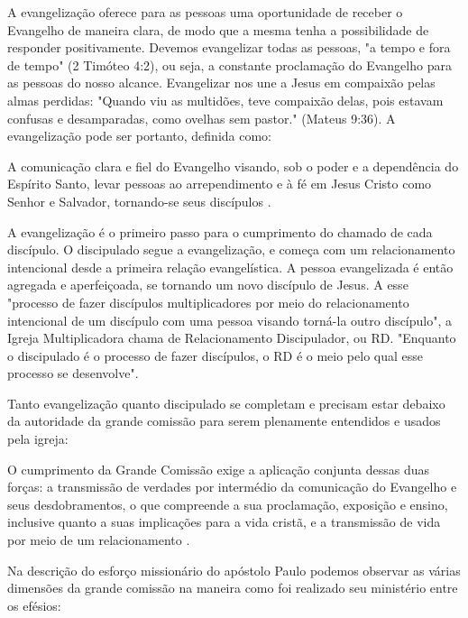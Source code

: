 \documentclass[12pt]{abntex2}
\begin{document}
A evangelização oferece para as pessoas uma oportunidade de receber o Evangelho de maneira clara, de modo que a mesma tenha a possibilidade de responder positivamente. Devemos evangelizar todas as pessoas, "a tempo e fora de tempo" (2 Timóteo 4:2), ou seja, a constante proclamação do Evangelho para as pessoas do nosso alcance. Evangelizar nos une a Jesus em compaixão pelas almas perdidas: "Quando viu as multidões, teve compaixão delas, pois estavam confusas e desamparadas, como ovelhas sem pastor." (Mateus 9:36). A evangelização pode ser portanto, definida como: 

\begin{citacao}A comunicação clara e fiel do Evangelho visando, sob o poder e a dependência do Espírito Santo, levar pessoas ao arrependimento e à fé em Jesus Cristo como Senhor e Salvador, tornando-se seus discípulos \cite[p. 57]{brandao}.\end{citacao}

A evangelização é o primeiro passo para o cumprimento do chamado de cada discípulo. O discipulado segue a evangelização, e começa com um relacionamento intencional desde a primeira relação evangelística. A pessoa evangelizada é então agregada e aperfeiçoada, se tornando um novo discípulo de Jesus. A esse "processo de fazer discípulos multiplicadores por meio do relacionamento intencional de um discípulo com uma pessoa visando torná-la outro discípulo"\cite[p. 64]{brandao}, a Igreja Multiplicadora chama de Relacionamento Discipulador, ou RD. "Enquanto o discipulado é o processo de fazer discípulos, o RD é o meio pelo qual esse processo se desenvolve"\cite[p. 64]{brandao}.

Tanto evangelização quanto discipulado se completam e precisam estar debaixo da autoridade da grande comissão para serem plenamente entendidos e usados pela igreja:

\begin{citacao}O cumprimento da Grande Comissão exige a aplicação conjunta dessas duas forças: a transmissão de verdades por intermédio da comunicação do Evangelho e seus desdobramentos, o que compreende a sua proclamação, exposição e ensino, inclusive quanto a suas implicações para a vida cristã, e a transmissão de	vida por meio de um relacionamento \cite[p. 66]{brandao}.\end{citacao} 

Na descrição do esforço missionário do apóstolo Paulo podemos observar as várias dimensões da grande comissão na maneira como foi realizado seu ministério entre os efésios:
\end{document}
